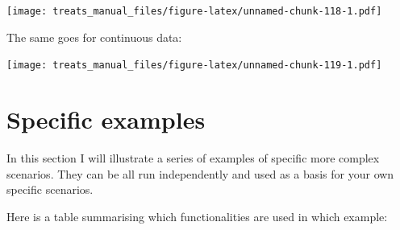 \documentclass[
]{book}
\newenvironment{Shaded}{\begin{snugshade}}{\end{snugshade}}
\newcommand{\CommentTok}[1]{\textcolor[rgb]{0.56,0.35,0.01}{\textit{#1}}}
\newcommand{\DataTypeTok}[1]{\textcolor[rgb]{0.13,0.29,0.53}{#1}}
\newcommand{\DecValTok}[1]{\textcolor[rgb]{0.00,0.00,0.81}{#1}}
\newcommand{\KeywordTok}[1]{\textcolor[rgb]{0.13,0.29,0.53}{\textbf{#1}}}
\newcommand{\NormalTok}[1]{#1}
\newcommand{\OperatorTok}[1]{\textcolor[rgb]{0.81,0.36,0.00}{\textbf{#1}}}
\newcommand{\StringTok}[1]{\textcolor[rgb]{0.31,0.60,0.02}{#1}}
\begin{document}
\texttt{[image: treats\_manual\_files/figure-latex/unnamed-chunk-118-1.pdf]}

The same goes for continuous data:

\begin{Shaded}
\end{Shaded}

\texttt{[image: treats\_manual\_files/figure-latex/unnamed-chunk-119-1.pdf]}

\hypertarget{specific-examples}{%
\chapter{Specific examples}\label{specific-examples}}

In this section I will illustrate a series of examples of specific more complex scenarios.
They can be all run independently and used as a basis for your own specific scenarios.

Here is a table summarising which functionalities are used in which example:
\end{document}
